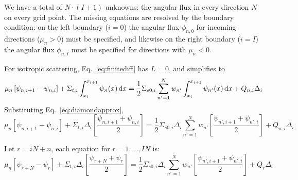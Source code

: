 \documentclass[]{SRJcommon}
\begin{document}
We have a total of $N\cdot(I+1)$ unknowns: the angular flux in every
direction $N$ on every grid point. The missing equations are resolved by the
boundary condition: on the left boundary ($i=0$) the angular flux $\phi_{n,0}$
for incoming directions ($\mu_n > 0$) must be specified, and likewise on the
right boundary ($i=I$) the angular flux $\phi_{n,I}$ must be specified
for directions with $\mu_n < 0$.

For isotropic scattering, Eq.~\eqref{eq:finitediff} has $L=0$, and simplifies to
$$
 \mu_n \left[ \psi_{n,i+1} - \psi_{n,i} \right] + \Sigma_{t,i}
  \int_{x_{i}}^{x_{i+1}} \psi_n(x) \, \mathrm{d} x
= \frac{1}{2} \Sigma_{s0,i} 
 \sum_{n'=1}^{N} w_{n'}  \int_{x_{i}}^{x_{i+1}} \psi_{n'}(x) \, \mathrm{d} x
  + Q_{n,i}  \Delta_i
$$
Substituting Eq.~\eqref{eq:diamondapprox},
$$ 
\mu_n \left[ \psi_{n,i+1} - \psi_{n,i} \right]
+ \Sigma_{t,i} \Delta_i \left[ \frac{\psi_{n,i+1} + \psi_{n,i}}{2} \right]
=
\frac{1}{2} \Sigma_{s0,i} \Delta_i 
\sum_{n'=1}^{N} w_{n'} \left[ \frac{\psi_{n',i+1} + \psi_{n',i}}{2} \right]
  + Q_{n,i} \Delta_i
$$

Let $r = iN + n$, each equation for $r = 1, \ldots, IN$ is:
$$
\mu_n \left[ \psi_{r + N} - \psi_{r} \right]
+ \Sigma_{t,i} \Delta_i \left[ \frac{\psi_{r + N} + \psi_{r}}{2} \right]
=
\frac{1}{2} \Sigma_{s0,i} \Delta_i 
\sum_{n'=1}^{N} w_{n'} \left[ \frac{\psi_{n',i+1} + \psi_{n',i}}{2} \right]
  + Q_{r} \Delta_i
$$

\nocite{Lew1984,Lar2007}


\end{document}
